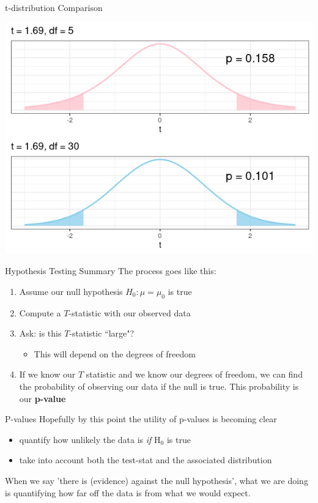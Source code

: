 \documentclass{beamer}
\begin{document}
\begin{frame}{t-distribution Comparison}
\begin{center}
\includegraphics[scale=0.5]{img/pval_compare.png}
\end{center}
\end{frame}

\begin{frame}{Hypothesis Testing Summary}
The process goes like this:
\begin{enumerate}
\item Assume our null hypothesis $H_0:\mu = \mu_0$ is true
\item Compute a $T$-statistic with our observed data
\item Ask: is this $T$-statistic ``large"? 
\begin{itemize}
\item This will depend on the degrees of freedom
\end{itemize}
\item If we know our $T$ statistic and we know our degrees of freedom, we can find the probability of observing our data if the null is true. This probability is our \textbf{p-value}
\end{enumerate}
\end{frame}

\begin{frame}{P-values}
Hopefully by this point the utility of p-values is becoming clear
\begin{itemize}
    \item quantify how unlikely the data is \textit{if} H$_0$ is true
    \item take into account both the test-stat and the associated distribution
\end{itemize} \vspace{8mm}

When we say 'there is (evidence) against the null hypothesis', what we are doing is quantifying how far off the data is from what we would expect.
    
\end{frame}
\end{document}
